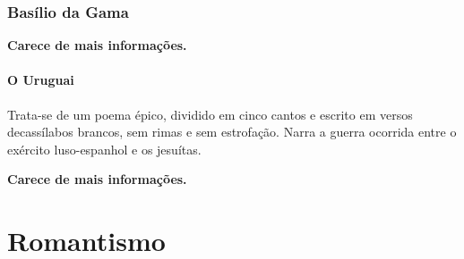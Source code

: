 \documentclass[12pt]{book}
\begin{document}
			\section{Basílio da Gama}
			\par \textbf{Carece de mais informações.}
				\subsection{O Uruguai}
				\par Trata-se de um poema épico, dividido em cinco cantos e escrito em versos decassílabos brancos, sem rimas e sem estrofação. Narra a guerra ocorrida entre o exército luso-espanhol e os jesuítas.
				\par \textbf{Carece de mais informações.}
				
	\part{Romantismo}
		
\end{document}
